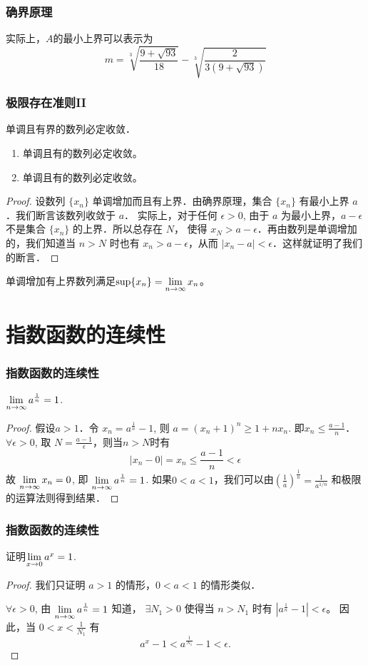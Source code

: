 \documentclass[14pt,notheorems,leqno,xcolor={rgb}]{beamer} %
\begin{document}
\begin{rframe}
\frametitle{确界原理}
实际上，$A$的最小上界可以表示为
\[m=\sqrt[3]{\frac{9+\sqrt{93}}{18}}-\sqrt[3]{\frac{2}{3(9+\sqrt{93})}}\]
\end{rframe}

\begin{frame}
\frametitle{极限存在准则II}
\begin{theorem*}[极限存在准则II]
单调且有界的数列必定收敛．\pause\unskip
\begin{enumerate}
  \item 单调且有的数列必定收敛。
  \item 单调且有的数列必定收敛。
\end{enumerate}
\end{theorem*}
\pause
\begin{proof}
设数列 $\{x_n\}$ 单调增加而且有上界．由确界原理，集合 $\{x_n\}$ 有最小上界 $a$．我们断言该数列收敛于 $a$．
实际上，对于任何 $\epsilon>0$, 由于 $a$ 为最小上界，$a-\epsilon$ 不是集合 $\{x_n\}$ 的上界．所以总存在 $N$，
使得 $x_N > a-\epsilon$．再由数列是单调增加的，我们知道当 $n>N$ 时也有 $x_n > a-\epsilon$，从而
$ |x_n-a| < \epsilon$．这样就证明了我们的断言．
\end{proof}
\pause
\begin{remark*}
单调增加有上界数列满足$\sup\{x_n\}=\lim\limits_{n\to\infty}x_n$。
\end{remark*}
\end{frame}

\section{指数函数的连续性}

\begin{frame}
\frametitle{指数函数的连续性}
\begin{example*}
$\lim\limits_{n\to\infty}a^{\frac1n}=1$.
\end{example*}
\pause
\begin{proof}
假设$a>1$．令 $x_n=a^{\frac1n}-1$, 则 $a=(x_n+1)^n\ge1+nx_n$.
即$x_n\le\frac{a-1}n$．$\forall \epsilon>0$, 取 $N=\frac{a-1}{\epsilon}$，则当$n>N$时有
$$|x_n-0|=x_n\le\frac{a-1}{n}<\epsilon$$
故 $\lim\limits_{n\to\infty} x_n =0$, 即 $\lim\limits_{n\to\infty}a^{\frac1n}=1$.
如果$0<a<1$，我们可以由$(\frac1a)^{\frac1n}=\frac1{a^{1/n}}$ 和极限的运算法则得到结果．
\end{proof}
\end{frame}

\begin{frame}
\frametitle{指数函数的连续性}
\begin{example*}
证明$\lim\limits_{x\to0}a^x=1$.
\end{example*}
\pause
\begin{proof}
我们只证明 $a>1$ 的情形，$0<a<1$ 的情形类似．\par
$\forall \epsilon>0$, 由 $\lim\limits_{n\to\infty}a^{\frac1n}=1$ 知道，
$\exists N_1>0$ 使得当 $n>N_1$ 时有 $|a^{\frac1n}-1|<\epsilon$。
因此，当 $0<x<\frac1{N_1}$ 有
\[a^x-1<a^{\frac{1}{N_1}}-1<\epsilon.\]
\end{proof}
\end{frame}
\end{document}
